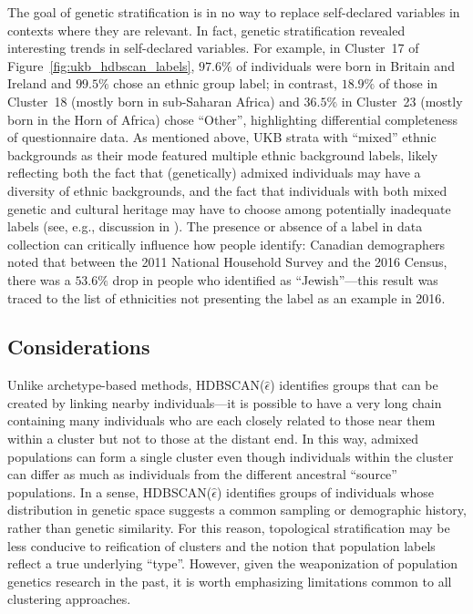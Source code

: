The goal of genetic stratification is in no way to replace self-declared variables in contexts where they are relevant. In fact, genetic stratification revealed interesting trends in self-declared variables. For example, in Cluster~17 of Figure~\ref{fig:ukb_hdbscan_labels}, $97.6\%$ of individuals were born in Britain and Ireland and $99.5\%$ chose an ethnic group label; in contrast, $18.9\%$ of those in Cluster~18 (mostly born in sub-Saharan Africa) and $36.5\%$ in Cluster~23 (mostly born in the Horn of Africa) chose ``Other'', highlighting differential completeness of questionnaire data. As mentioned above, UKB strata with ``mixed'' ethnic backgrounds as their mode featured multiple ethnic background labels, likely reflecting both the fact that (genetically) admixed individuals may have a diversity of ethnic backgrounds, and the fact that individuals with both mixed genetic and cultural heritage may have to choose among potentially inadequate labels (see, e.g., discussion in \citep{martschenko_including_2023}). The presence or absence of a label in data collection can critically influence how people identify: Canadian demographers noted that between the 2011 National Household Survey and the 2016 Census, there was a $53.6\%$ drop in people who identified as ``Jewish''---this result was traced to the list of ethnicities not presenting the label as an example in 2016\citep{government_of_canada_technical_2019}. 

\subsection{Considerations}

Unlike archetype-based methods, HDBSCAN($\hat{\epsilon}$) identifies groups that can be created by linking nearby individuals---it is possible to have a very long chain containing many individuals who are each closely related to those near them within a cluster but not to those at the distant end. In this way, admixed populations can form a single cluster even though individuals within the cluster can differ as much as individuals from the different ancestral ``source'' populations. In a sense, HDBSCAN($\hat{\epsilon}$) identifies groups of individuals whose distribution in genetic space suggests a common sampling or demographic history, rather than genetic similarity. For this reason, topological stratification may be less conducive to reification of clusters and the notion that population labels reflect a true underlying ``type''.  However, given the weaponization of population genetics research in the past\citep{carlson_counter_2022}, it is worth emphasizing limitations common to all clustering approaches.


